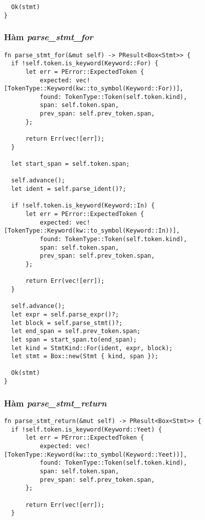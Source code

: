 {\begin{lstlisting}
  Ok(stmt)
}
\end{lstlisting}

\subsubsection{Hàm \textit{parse\_stmt\_for}}
\label{ap1:stmt_for}
\begin{lstlisting}
fn parse_stmt_for(&mut self) -> PResult<Box<Stmt>> {
  if !self.token.is_keyword(Keyword::For) {
      let err = PError::ExpectedToken {
          expected: vec![TokenType::Keyword(kw::to_symbol(Keyword::For))],
          found: TokenType::Token(self.token.kind),
          span: self.token.span,
          prev_span: self.prev_token.span,
      };

      return Err(vec![err]);
  }

  let start_span = self.token.span;

  self.advance();
  let ident = self.parse_ident()?;

  if !self.token.is_keyword(Keyword::In) {
      let err = PError::ExpectedToken {
          expected: vec![TokenType::Keyword(kw::to_symbol(Keyword::In))],
          found: TokenType::Token(self.token.kind),
          span: self.token.span,
          prev_span: self.prev_token.span,
      };

      return Err(vec![err]);
  }

  self.advance();
  let expr = self.parse_expr()?;
  let block = self.parse_stmt()?;
  let end_span = self.prev_token.span;
  let span = start_span.to(end_span);
  let kind = StmtKind::For(ident, expr, block);
  let stmt = Box::new(Stmt { kind, span });

  Ok(stmt)
}
\end{lstlisting}

\subsubsection{Hàm \textit{parse\_stmt\_return}}
\label{ap1:stmt_yeet}
\begin{lstlisting}
fn parse_stmt_return(&mut self) -> PResult<Box<Stmt>> {
  if !self.token.is_keyword(Keyword::Yeet) {
      let err = PError::ExpectedToken {
          expected: vec![TokenType::Keyword(kw::to_symbol(Keyword::Yeet))],
          found: TokenType::Token(self.token.kind),
          span: self.token.span,
          prev_span: self.prev_token.span,
      };

      return Err(vec![err]);
  }


\end{lstlisting}}
